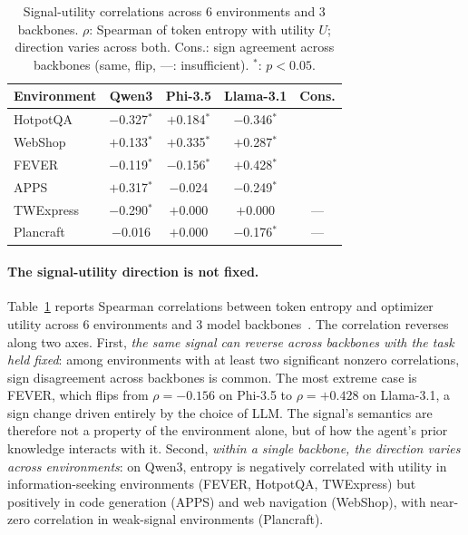 \begin{table}
	\vspace{-12pt}
	\caption{Signal-utility correlations across 6 environments and 3 backbones. $\rho$: Spearman of token entropy with utility $U$; direction varies across both. Cons.: sign agreement across backbones (\cmark same, \xmark flip, ---: insufficient). $^*$: $p{<}0.05$.}
	\label{tab:signal-discovery}
	\centering\footnotesize
	\setlength{\tabcolsep}{3pt}
	\begin{tabular}{lcccc}
		\toprule
		Environment & Qwen3 & Phi-3.5 & Llama-3.1 & Cons. \\
		\midrule
		HotpotQA   & $-$0.327$^*$ & $+$0.184$^*$ & $-$0.346$^*$ & \xmark \\
		WebShop    & $+$0.133$^*$ & $+$0.335$^*$ & $+$0.287$^*$ & \cmark \\
		FEVER      & $-$0.119$^*$ & $-$0.156$^*$ & $+$0.428$^*$ & \xmark \\
		APPS       & $+$0.317$^*$ & $-$0.024     & $-$0.249$^*$ & \xmark \\
		TWExpress  & $-$0.290$^*$ & $+$0.000     & $+$0.000     & --- \\
		Plancraft  & $-$0.016     & $+$0.000     & $-$0.176$^*$ & --- \\
		\bottomrule
	\end{tabular}
	\vspace{-10pt}
\end{table}

\paragraph{The signal-utility direction is not fixed.}
Table~\ref{tab:signal-discovery} reports Spearman correlations between token entropy and optimizer utility across 6 environments and 3 model backbones~\cite{DBLP:journals/corr/abs-2505-09388, DBLP:journals/corr/abs-2407-21783, DBLP:journals/corr/abs-2404-14219}. The correlation reverses along two axes. First, \emph{the same signal can reverse across backbones with the task held fixed}: among environments with at least two significant nonzero correlations, sign disagreement across backbones is common. The most extreme case is FEVER, which flips from $\rho{=}{-}0.156$ on Phi-3.5 to $\rho{=}{+}0.428$ on Llama-3.1, a sign change driven entirely by the choice of LLM. The signal's semantics are therefore not a property of the environment alone, but of how the agent's prior knowledge interacts with it. Second, \emph{within a single backbone, the direction varies across environments}: on Qwen3, entropy is negatively correlated with utility in information-seeking environments (FEVER, HotpotQA, TWExpress) but positively in code generation (APPS) and web navigation (WebShop), with near-zero correlation in weak-signal environments (Plancraft).

